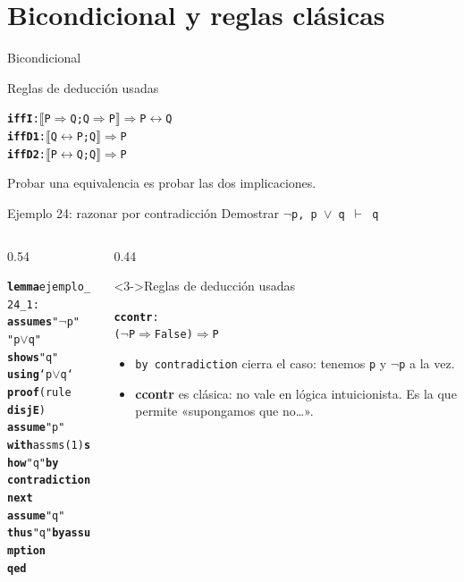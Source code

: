 \documentclass[11pt,aspectratio=169]{beamer}
\newcommand{\sOr}{\(\vee\)}
\newcommand{\sNot}{\(\neg\)}
\newcommand{\sIff}{\(\longleftrightarrow\)}
\newcommand{\sMeta}{\(\Longrightarrow\)}
\newcommand{\sTurn}{\(\vdash\)}
\newcommand{\sLb}{\(\llbracket\)}
\newcommand{\sRb}{\(\rrbracket\)}
\newcommand{\kw}[1]{\textcolor{isaCmd}{\textbf{#1}}}
\newcommand{\str}[1]{\textcolor{isaStr}{#1}}
\newcommand{\Rn}[1]{\textcolor{granate}{\textbf{#1}}}
\newcommand{\R}[1]{{\setlength{\fboxsep}{1pt}%
  \colorbox{resalte}{\ttfamily\bfseries\textcolor{granate}{#1}}}}
\begin{document}
\section{Bicondicional y reglas clásicas}

\begin{frame}[fragile]{Bicondicional}
  \begin{block}{Reglas de deducción usadas}
\begin{alltt}\footnotesize
\Rn{iffI}:  \sLb{}P \sMeta{} Q; Q \sMeta{} P\sRb{} \sMeta{} P \sIff{} Q
\Rn{iffD1}: \sLb{}Q \sIff{} P; Q\sRb{} \sMeta{} P
\Rn{iffD2}: \sLb{}P \sIff{} Q; Q\sRb{} \sMeta{} P
\end{alltt}
\end{block}
  \pause
  \vfill
  \begin{center}
    Probar una equivalencia es probar \alert{las dos implicaciones}.
  \end{center}
\end{frame}

\begin{frame}[fragile]{Ejemplo 24:  razonar por contradicción}
  Demostrar \quad \texttt{\sNot p,\; p \sOr{} q \;\sTurn{}\; q}
  \vspace{0.4em}
  \pause
  \begin{columns}[T]
    \begin{column}{0.54\textwidth}
\begin{alltt}\footnotesize
\kw{lemma} ejemplo_24_1:
  \kw{assumes} \str{"\sNot p"}
          \str{"p \sOr{} q"}
  \kw{shows} \str{"q"}
\kw{using} `p \sOr{} q`
\kw{proof} (rule \R{disjE})
  \kw{assume} \str{"p"}
  \kw{with} assms(1) \kw{show} \str{"q"} \kw{by} \R{contradiction}
\kw{next}
  \kw{assume} \str{"q"}
  \kw{thus} \str{"q"} \kw{by} \kw{assumption}
\kw{qed}
\end{alltt}
    \end{column}
    \begin{column}{0.44\textwidth}
      \begin{block}<3->{Reglas de deducción usadas}
\begin{alltt}\scriptsize
\Rn{ccontr}:
  (\sNot P \sMeta{} False) \sMeta{} P
\end{alltt}
\end{block}
      \footnotesize
      \begin{itemize}
        \item<4-> \texttt{by contradiction} cierra el caso: tenemos
          \texttt{p} y \texttt{\sNot p} a la vez.
        \item<5-> \alert{\Rn{ccontr} es clásica}: no vale en lógica
          intuicionista. Es la que permite «supongamos que no\ldots».
      \end{itemize}
    \end{column}
  \end{columns}
\end{frame}
\end{document}
